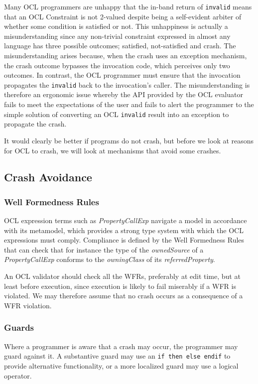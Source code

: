\documentclass[
]{ceurart}
\begin{document}
Many OCL programmers are unhappy that the in-band return of \verb|invalid| means that an OCL Constraint is not 2-valued despite being a self-evident arbiter of whether some condition is satisfied or not. This unhappiness is actually a misunderstanding \cite{OCLreflections} since any non-trivial constraint expressed in almost any language has three possible outcomes; satisfied, not-satisfied and crash. The misunderstanding arises because, when the crash uses an exception mechanism, the crash outcome bypasses the invocation code, which perceives only two outcomes. In contrast, the OCL programmer must ensure that the invocation propagates the \verb|invalid| back to the invocation's caller. The misunderstanding is therefore an ergonomic issue whereby the API provided by the OCL evaluator fails to meet the expectations of the user and fails to alert the programmer to the simple solution of converting an OCL \verb|invalid| result into an exception to propagate the crash.

It would clearly be better if programs do not crash, but before we look at reasons for OCL to crash, we will look at mechanisms that avoid some crashes.

\subsection{Crash Avoidance}

\subsubsection{Well Formedness Rules} OCL expression terms such as \emph{PropertyCallExp} navigate a model in accordance with its metamodel, which provides a strong type system with which the OCL expressions must comply. Compliance is defined by the Well Formedness Rules that can check that for instance the type of the \emph{ownedSource} of a \emph{PropertyCallExp} conforms to the \emph{owningClass} of its \emph{referredProperty}.

An OCL validator should check all the WFRs, preferably at edit time, but at least before execution, since execution is likely to fail miserably if a WFR is violated. We may therefore assume that no crash occurs as a consequence of a WFR violation.

\subsubsection{Guards}\label{Guards} Where a programmer is aware that a crash may occur, the programmer may guard against it. A substantive guard may use an \verb|if then else endif| to provide alternative functionality, or a more localized guard may use a logical operator.
\end{document}
